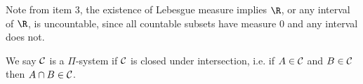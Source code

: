 Note from item 3, the existence of Lebesgue measure implies $\R$, or any interval of $\R$, is uncountable, since all countable subsets have measure 0 and any interval does not.
\begin{df}
We say $\cal C$ is a $\Pi$-system if $\cal C$ is closed under intersection, i.e. if $A\in \cal C$ and $B\in \cal C$ then $A\cap B\in \cal C$.
\end{df}


